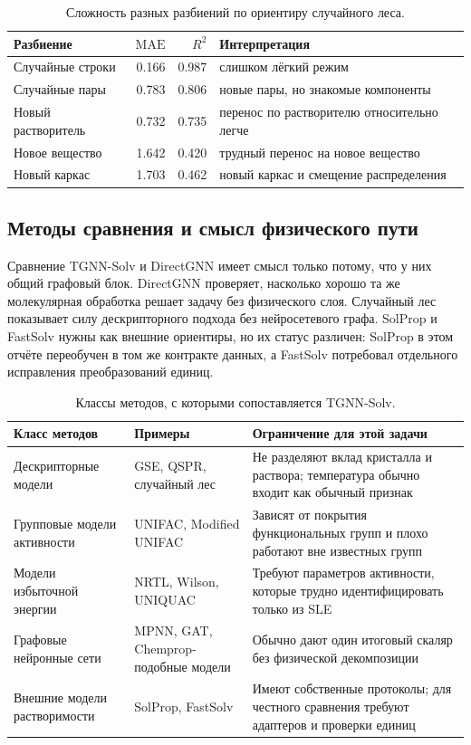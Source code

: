 \documentclass[11pt]{article}
\newcommand{\mae}{\mathrm{MAE}}
\newcommand{\Rtwo}{R^2}
\theoremstyle{definition}
\begin{document}
\begin{table}[!htbp]
\centering
\caption{Сложность разных разбиений по ориентиру случайного леса.}
\label{tab:app-split-difficulty}
\small
\begin{tabular}{lrrl}
\toprule
Разбиение & $\mae$ & $\Rtwo$ & Интерпретация \\
\midrule
Случайные строки & 0.166 & 0.987 & слишком лёгкий режим \\
Случайные пары & 0.783 & 0.806 & новые пары, но знакомые компоненты \\
Новый растворитель & 0.732 & 0.735 & перенос по растворителю относительно легче \\
Новое вещество & 1.642 & 0.420 & трудный перенос на новое вещество \\
Новый каркас & 1.703 & 0.462 & новый каркас и смещение распределения \\
\bottomrule
\end{tabular}
\end{table}

\subsection{Методы сравнения и смысл физического пути}

Сравнение TGNN-Solv и DirectGNN имеет смысл только потому, что у них общий графовый блок. DirectGNN проверяет, насколько хорошо та же молекулярная обработка решает задачу без физического слоя. Случайный лес показывает силу дескрипторного подхода без нейросетевого графа. SolProp и FastSolv нужны как внешние ориентиры, но их статус различен: SolProp в этом отчёте переобучен в том же контракте данных, а FastSolv потребовал отдельного исправления преобразований единиц.

\begin{table}[!htbp]
\centering
\caption{Классы методов, с которыми сопоставляется TGNN-Solv.}
\label{tab:app-method-classes}
\small
\begin{tabularx}{\textwidth}{P{0.20\textwidth}P{0.20\textwidth}Y}
\toprule
Класс методов & Примеры & Ограничение для этой задачи \\
\midrule
Дескрипторные модели & GSE, QSPR, случайный лес & Не разделяют вклад кристалла и раствора; температура обычно входит как обычный признак \\
Групповые модели активности & UNIFAC, Modified UNIFAC & Зависят от покрытия функциональных групп и плохо работают вне известных групп \\
Модели избыточной энергии & NRTL, Wilson, UNIQUAC & Требуют параметров активности, которые трудно идентифицировать только из SLE \\
Графовые нейронные сети & MPNN, GAT, Chemprop-подобные модели & Обычно дают один итоговый скаляр без физической декомпозиции \\
Внешние модели растворимости & SolProp, FastSolv & Имеют собственные протоколы; для честного сравнения требуют адаптеров и проверки единиц \\
\bottomrule
\end{tabularx}
\end{table}
\end{document}
